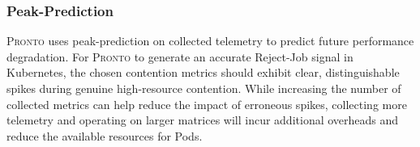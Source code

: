 %
%
%

\subsubsection{Peak-Prediction}
\textsc{Pronto} uses peak-prediction on collected telemetry to predict future
performance degradation. For \textsc{Pronto} to generate an accurate Reject-Job
signal in Kubernetes, the chosen contention metrics should exhibit clear,
distinguishable spikes during genuine high-resource contention. While increasing
the number of collected metrics can help reduce the impact of erroneous spikes,
collecting more telemetry and operating on larger matrices will incur additional
overheads and reduce the available resources for Pods.

